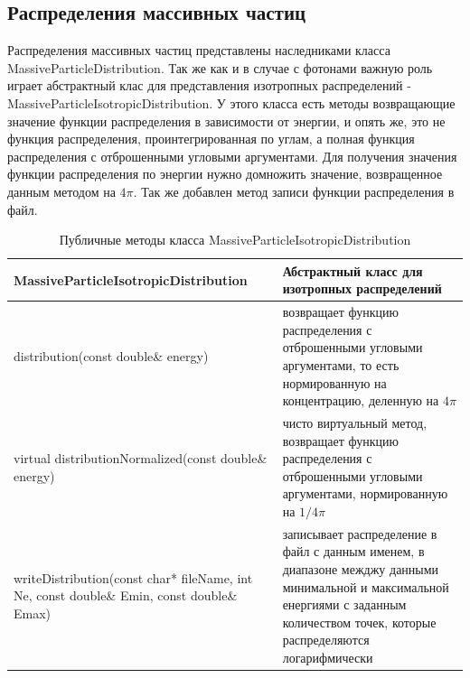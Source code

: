 \subsection{Распределения массивных частиц}
Распределения массивных частиц представлены наследниками класса MassiveParticleDistribution. Так же как и в случае с фотонами важную роль играет абстрактный клас для представления изотропных распределений - MassiveParticleIsotropicDistribution. У этого класса есть методы возвращающие значение функции распределения в зависимости от энергии, и опять же, это не функция распределения, проинтегрированная по углам, а полная функция распределения с отброшенными угловыми аргументами. Для получения значения функции распределения по энергии нужно домножить значение, возвращенное данным методом на $4 \pi$. Так же добавлен метод записи функции распределения в файл. 

\begin{table}
	\begin{center}
		\caption{Публичные методы класса MassiveParticleIsotropicDistribution }
		\label{MassiveParticleMethods}
		\begin{small}
			\begin{tabularx}{\textwidth}{|X|X|}
				\hline
				\textbf{MassiveParticleIsotropicDistribution} & Абстрактный класс для изотропных распределений\\
				\hline
				distribution(const double\& energy) & возвращает функцию распределения с отброшенными угловыми аргументами, то есть нормированную на концентрацию, деленную на $4 \pi$ \\
				\hline
				virtual distributionNormalized(const double\& energy) & чисто виртуальный метод, возвращает функцию распределения с отброшенными угловыми аргументами, нормированную на  $ 1 / 4 \pi$\\
				\hline
				writeDistribution(const char* fileName, int Ne, const double\& Emin, const double\& Emax) & записывает распределение в файл с данным именем, в диапазоне межджу данными минимальной и максимальной енергиями с заданным количеством точек, которые распределяются логарифмически\\
				\hline
			\end{tabularx}
		\end{small}
	\end{center}
\end{table}

